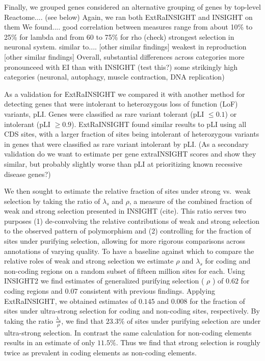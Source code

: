 \documentclass[11pt]{article}
\begin{document}
Finally, we grouped genes
considered an alternative grouping of genes by top-level Reactome.... (see below)
Again, we ran both ExtRaINSIGHT and INSIGHT on them
We found....
good correlation between measures
range from about 10\% to 25\% for lambda
and from 60 to 75\% for rho (check)
strongest selection in neuronal system.  similar to.... [other similar findings]
weakest in reproduction [other similar findings]
Overall, substantial differences across categories
more pronounceed with EI than with INSIGHT (test this?)
some strikingly high categories (neuronal, autophagy, muscle contraction, DNA replication)


As a validation for ExtRaINSIGHT we compared it with another method for detecting genes that were intolerant to heterozygous loss of function (LoF) variants, pLI. Genes were classified as rare variant tolerant (pLI $\leq 0.1$) or intolerant (pLI $\geq 0.9$). ExtRaINSIGHT found similar results to pLI using all CDS sites, with a larger fraction of sites being intolerant of heterozygous variants in genes that were classified as rare variant intolerant by pLI.  (As a secondary validation do we want to estimate per gene extraINSIGHT scores and show they similar, but probably slightly worse than pLI at prioritizing known recessive disease genes?) 

We then sought to estimate the relative fraction of sites under strong vs.\ weak selection by taking the ratio of $\lambda_s$ and $\rho$, a measure of the combined fraction of weak and strong selection presented in INSIGHT (cite). This ratio serves two purposes (1) de-convolving the relative contributions of weak and strong selection to the observed pattern of polymorphism and (2) controlling for the fraction of sites under purifying selection, allowing for more rigorous comparisons across annotations of varying quality. To have a baseline against which to compare the relative roles of weak and strong selection we estimate $\rho$ and $\lambda_s$ for coding and non-coding regions on a random subset of fifteen million sites for each. Using INSIGHT2 we find estimates of generalized purifying selection ( $\rho$ ) of $0.62$ for coding regions and $0.07$ consistent with previous findings. Applying ExtRaINSIGHT, we obtained estimates of $0.145$ and $0.008$ for the fraction of sites under ultra-strong selection for coding and non-coding sites, respectively. By taking the ratio $\frac{\lambda_s}{\rho}$, we find that $23.3\%$ of sites under purifying selection are under ultra-strong selection. In contrast the same calculation for non-coding elements results in an estimate of only $11.5\%$. Thus we find that strong selection is roughly twice as prevalent in coding elements as non-coding elements.
\end{document}
